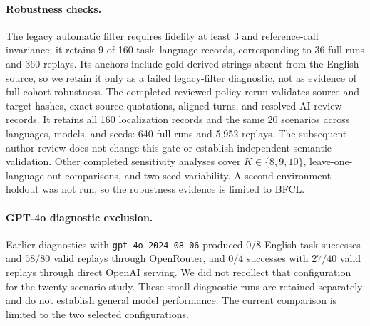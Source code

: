 \documentclass[11pt]{article}
\begin{document}
\paragraph{Robustness checks.} The legacy automatic filter requires fidelity at
least 3 and reference-call invariance; it retains 9 of 160 task--language
records, corresponding to 36 full runs and 360 replays. Its anchors include
gold-derived strings absent from the English source, so we retain it only as a
failed legacy-filter diagnostic, not as evidence of full-cohort robustness.
The completed reviewed-policy rerun validates source and target hashes, exact
source quotations, aligned turns, and resolved AI review records. It retains
all 160 localization records and the same 20 scenarios across languages,
models, and seeds: 640 full runs and 5,952 replays. The subsequent author review
does not change this gate or establish independent semantic validation.
Other completed sensitivity analyses cover $K\in\{8,9,10\}$,
leave-one-language-out comparisons, and two-seed variability. A
second-environment holdout was not run, so the robustness evidence is limited
to BFCL.

\paragraph{GPT-4o diagnostic exclusion.} Earlier diagnostics with
\texttt{gpt-4o-2024-08-06} produced $0/8$ English task successes and $58/80$
valid replays through OpenRouter, and $0/4$ successes with $27/40$ valid
replays through direct OpenAI serving. We did not recollect that configuration
for the twenty-scenario study. These small diagnostic runs are retained
separately and do not establish general model performance. The current
comparison is limited to the two selected configurations.


\end{document}
